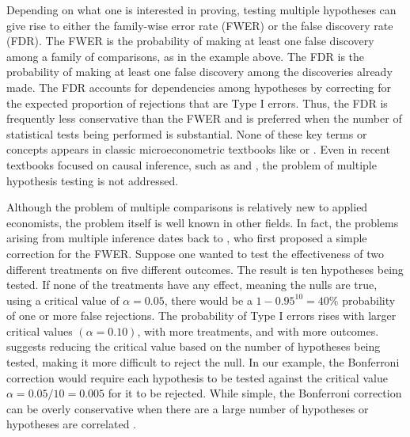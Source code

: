 \documentclass[11pt]{article}
\begin{document}
Depending on what one is interested in proving, testing multiple hypotheses can give rise to either the family-wise error rate (FWER) or the false discovery rate (FDR). The FWER is the probability of making at least one false discovery among a family of comparisons, as in the example above. The FDR is the probability of making at least one false discovery among the discoveries already made. The FDR accounts for dependencies among hypotheses by correcting for the expected proportion of rejections that are Type I errors. Thus, the FDR is frequently less conservative than the FWER and is preferred when the number of statistical tests being performed is substantial. None of these key terms or concepts appears in classic microeconometric textbooks like \cite{cameron_microeconometrics_2005} or \cite{wooldridge_econometric_2010}. Even in recent textbooks focused on causal inference, such as \cite{imbens_causal_2015} and \cite{morgan_counterfactuals_2015}, the problem of multiple hypothesis testing is not addressed.

Although the problem of multiple comparisons is relatively new to applied economists, the problem itself is well known in other fields. In fact, the problems arising from multiple inference dates back to \cite{bonferroni_il_1935}, who first proposed a simple correction for the FWER. Suppose one wanted to test the effectiveness of two different treatments on five different outcomes. The result is ten hypotheses being tested. If none of the treatments have any effect, meaning the nulls are true, using a critical value of $\alpha = 0.05$, there would be a $1 - 0.95^{10} = 40\%$ probability of one or more false rejections. The probability of Type I errors rises with larger critical values $\left( \alpha = 0.10 \right)$, with more treatments, and with more outcomes. \cite{bonferroni_il_1935} suggests reducing the critical value based on the number of hypotheses being tested, making it more difficult to reject the null. In our example, the Bonferroni correction would require each hypothesis to be tested against the critical value $\alpha = 0.05 \slash 10 = 0.005$ for it to be rejected. While simple, the Bonferroni correction can be overly conservative when there are a large number of hypotheses or hypotheses are correlated \citep{list_multiple_2019}.
\end{document}
